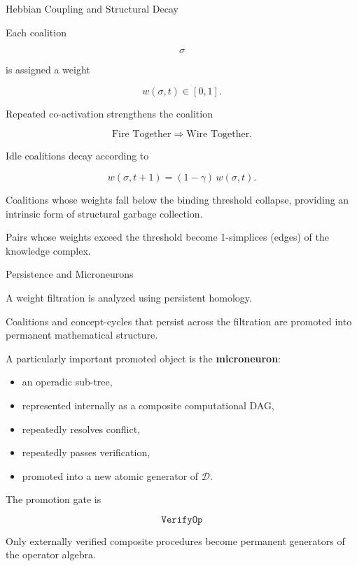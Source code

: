 
\begin{mosbox}{Hebbian Coupling and Structural Decay}

\BodyFont

Each coalition

\[
\sigma
\]

is assigned a weight

\[
w(\sigma,t)\in[0,1].
\]

Repeated co-activation strengthens the coalition

\[
\boxed{
\text{Fire Together}
\Longrightarrow
\text{Wire Together}.
}
\]

Idle coalitions decay according to

\[
\boxed{
w(\sigma,t+1)
=
(1-\gamma)\,
w(\sigma,t).
}
\]

Coalitions whose weights fall below the binding threshold collapse,
providing an intrinsic form of structural garbage collection.

Pairs whose weights exceed the threshold become
1-simplices (edges) of the knowledge complex.

\end{mosbox}


\begin{mosbox}{Persistence and Microneurons}

\BodyFont

A weight filtration is analyzed using persistent homology.

Coalitions and concept-cycles that persist across the filtration are
promoted into permanent mathematical structure.

A particularly important promoted object is the
\textbf{microneuron}:

\begin{itemize}

\item an operadic sub-tree,

\item represented internally as a composite computational DAG,

\item repeatedly resolves conflict,

\item repeatedly passes verification,

\item promoted into a new atomic generator of
$\mathcal D$.

\end{itemize}

The promotion gate is

\[
\boxed{
\texttt{VerifyOp}
}
\]

Only externally verified composite procedures become permanent generators
of the operator algebra.

\end{mosbox}

